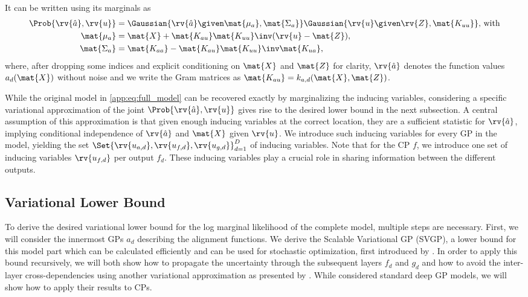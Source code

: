 \documentclass{article}
\begin{document}
It can be written using its marginals \parencite{titsias_variational_2009} as
\begin{align}
\label{app:eq:augmented_joint}
\begin{split}
    \Prob{\rv{\hat{a}}, \rv{u}} &= \Gaussian{\rv{\hat{a}} \given \mat{\mu_a}, \mat{\Sigma_a}}\Gaussian{\rv{u} \given \rv{Z}, \mat{K_{uu}}}\text{, with} \\
    \mat{\mu_a} &= \mat{X} + \mat{K_{au}}\mat{K_{uu}}\inv(\rv{u} - \mat{Z}), \\
    \mat{\Sigma_a} &= \mat{K_{aa}} - \mat{K_{au}}\mat{K_{uu}}\inv\mat{K_{ua}},
\end{split}
\end{align}
where, after dropping some indices and explicit conditioning on $\mat{X}$ and $\mat{Z}$ for clarity, $\rv{\hat{a}}$ denotes the function values $a_d(\mat{X})$ without noise and we write the Gram matrices as $\mat{K_{au}} = k_{a, d}(\mat{X}, \mat{Z})$.

While the original model in \cref{app:eq:full_model} can be recovered exactly by marginalizing the inducing variables, considering a specific variational approximation of the joint $\Prob{\rv{\hat{a}}, \rv{u}}$ gives rise to the desired lower bound in the next subsection.
A central assumption of this approximation \parencite{titsias_variational_2009} is that given enough inducing variables at the correct location, they are a sufficient statistic for $\rv{\hat{a}}$, implying conditional independence of $\rv{\hat{a}}$ and $\mat{X}$ given $\rv{u}$.
We introduce such inducing variables for every GP in the model, yielding the set $\Set{\rv{u_{a, d}}, \rv{u_{f, d}}, \rv{u_{g, d}}}_{d=1}^D$ of inducing variables.
Note that for the CP $f$, we introduce one set of inducing variables $\rv{u_{f, d}}$ per output $f_d$.
These inducing variables play a crucial role in sharing information between the different outputs.


\subsection{Variational Lower Bound}
\label{app:subsec:lower_bound}
To derive the desired variational lower bound for the log marginal likelihood of the complete model, multiple steps are necessary.
First, we will consider the innermost GPs $a_d$ describing the alignment functions.
We derive the Scalable Variational GP (SVGP), a lower bound for this model part which can be calculated efficiently and can be used for stochastic optimization, first introduced by \textcite{hensman_gaussian_2013}.
In order to apply this bound recursively, we will both show how to propagate the uncertainty through the subsequent layers $f_d$ and $g_d$ and how to avoid the inter-layer cross-dependencies using another variational approximation as presented by \textcite{hensman_nested_2014}.
While \citeauthor{hensman_nested_2014} considered standard deep GP models, we will show how to apply their results to CPs.
\end{document}
